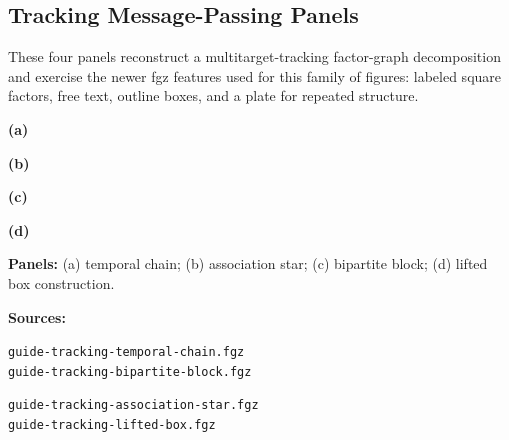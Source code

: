 \documentclass{article}
\begin{document}
\vspace{0.5cm}
\begin{samepage}
  \centering
  \scalebox{0.85}{}
\end{samepage}

\clearpage
\subsection{Tracking Message-Passing Panels}
These four panels reconstruct a multitarget-tracking factor-graph decomposition and
exercise the newer fgz features used for this family of figures: labeled square
factors, free text, outline boxes, and a plate for repeated structure.

\vspace{0.5cm}
\begin{samepage}
  \noindent
  \begin{minipage}[t]{0.48\textwidth}
    \centering
    \scalebox{0.68}{}

    \smallskip
    \textbf{(a)}
  \end{minipage}\hfill
  \vspace{0.5cm}
  \begin{minipage}[t]{0.48\textwidth}
    \centering
    \scalebox{0.68}{}

    \smallskip
    \textbf{(b)}
  \end{minipage}
\end{samepage}

\medskip

\begin{samepage}
  \noindent
  \begin{minipage}[t]{0.48\textwidth}
    \centering
    \scalebox{0.68}{}

    \smallskip
    \textbf{(c)}
  \end{minipage}\hfill
  \begin{minipage}[t]{0.48\textwidth}
    \centering
    \scalebox{0.68}{}

    \smallskip
    \textbf{(d)}
  \end{minipage}
\end{samepage}

\medskip
\textbf{Panels:} (a) temporal chain; (b) association star; (c) bipartite block; (d)
lifted box construction.

\smallskip
\textbf{Sources:}
\begin{minipage}[t]{0.48\textwidth}
  \texttt{guide-tracking-temporal-chain.fgz}\\
  \texttt{guide-tracking-bipartite-block.fgz}
\end{minipage}\hfill
\begin{minipage}[t]{0.48\textwidth}
  \texttt{guide-tracking-association-star.fgz}\\
  \texttt{guide-tracking-lifted-box.fgz}
\end{minipage}
\end{document}
